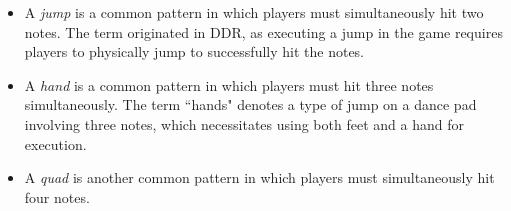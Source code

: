 \begin{itemize}
	\item A \textit{jump} is a common pattern in which players must simultaneously hit two notes. The term originated in DDR, as executing a jump in the game requires players to physically jump to successfully hit the notes.
	      
	      
	      
	\item A \textit{hand} is a common pattern in which players must hit three notes simultaneously. The term ``hands" denotes a type of jump on a dance pad involving three notes, which necessitates using both feet and a hand for execution.
	      
	\item A \textit{quad} is another common pattern in which players must simultaneously hit four notes.
\end{itemize}


